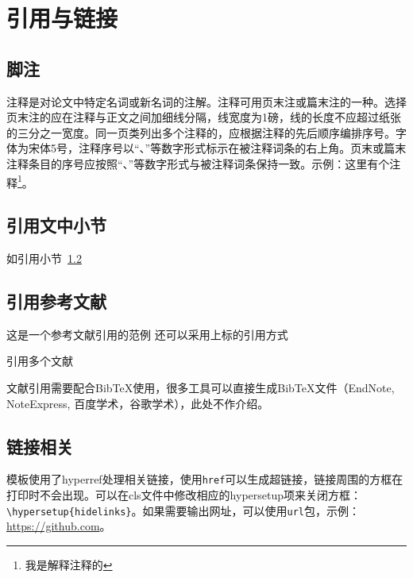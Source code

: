 
\chapter{引用与链接}

\section{脚注}
注释是对论文中特定名词或新名词的注解。注释可用页末注或篇末注的一种。选择页末注的应在注释与正文之间加细线分隔，线宽度为1磅，线的长度不应超过纸张的三分之一宽度。同一页类列出多个注释的，应根据注释的先后顺序编排序号。字体为宋体5号，注释序号以“、”等数字形式标示在被注释词条的右上角。页末或篇末注释条目的序号应按照“、”等数字形式与被注释词条保持一致。示例：这里有个注释\footnote{我是解释注释的}。

\section{引用文中小节}\label{sec:ref}
如引用小节~\ref{sec:ref}

\section{引用参考文献}
这是一个参考文献\cite{targ2016resnet}引用的范例\cite{kuhn2004man}
还可以采用上标的引用方式

引用多个文献\cite{kuhn2004man,江泽民2008新时期我国信息技术产业的发展,江泽民1989能源发展趋势及主要节能措施}

文献引用需要配合BibTeX使用，很多工具可以直接生成BibTeX文件（EndNote, NoteExpress, 百度学术，谷歌学术），此处不作介绍。

\section{链接相关}
模板使用了hyperref处理相关链接，使用\verb|href|可以生成超链接，链接周围的方框在打印时不会出现。可以在cls文件中修改相应的hypersetup项来关闭方框：\verb|\hypersetup{hidelinks}|。如果需要输出网址，可以使用\verb|url|包，示例：\url{https://github.com}。